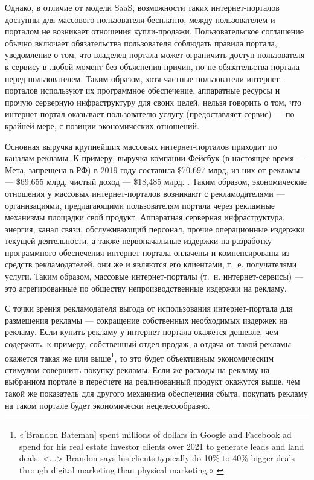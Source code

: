\documentclass{article}
\begin{document}
Однако, в отличие от модели SaaS, возможности таких интернет-порталов доступны для массового пользователя бесплатно, между пользователем и порталом не возникает отношения купли-продажи. Пользовательское соглашение обычно включает обязательства пользователя соблюдать правила портала, уведомление о том, что владелец портала может ограничить доступ пользователя к сервису в любой момент без объяснения причин, но не обязательства портала перед пользователем. Таким образом, хотя частные пользователи интернет-порталов используют их программное обеспечение, аппаратные ресурсы и прочую серверную инфраструктуру для своих целей, нельзя говорить о том, что интернет-портал оказывает пользователю услугу (предоставляет сервис) — по крайней мере, с позиции экономических отношений.

Основная выручка крупнейших массовых интернет-порталов приходит по каналам рекламы. К примеру, выручка компании Фейсбук (в настоящее время — Мета, запрещена в РФ) в 2019 году составила \$70.697 млрд, из них от рекламы — \$69.655 млрд, чистый доход — \$18,485 млрд. \cite{facebook10K2019}. Таким образом, экономические отношения у массовых интернет-порталов возникают с рекламодателями — организациями, предлагающими пользователям портала через рекламные механизмы площадки свой продукт. Аппаратная серверная инфраструктура, энергия, канал связи, обслуживающий персонал, прочие операционные издержки текущей деятельности, а также первоначальные издержки на разработку программного обеспечения интернет-портала оплачены и компенсированы из средств рекламодателей, они же и являются его клиентами, т.~е. получателями услуги. Таким образом, массовые интернет-порталы (т.~н. интернет-сервисы) — это агрегированные по обществу непроизводственные издержки на рекламу.

С точки зрения рекламодателя выгода от использования интернет-портала для размещения рекламы — сокращение собственных необходимых издержек на рекламу. Если купить рекламу у интернет-портала окажется дешевле, чем содержать, к примеру, собственный отдел продаж, а отдача от такой рекламы окажется такая же или выше\footnote{«[Brandon Bateman] spent millions of dollars in Google and Facebook ad spend for his real estate investor clients over 2021 to generate leads and land deals. <...> Brandon says his clients typically do 10\% to 40\% bigger deals through digital marketing than physical marketing.» \cite{roiSEOvsGooglevsFacebook}}, то это будет объективным экономическим стимулом совершить покупку рекламы. Если же расходы на рекламу на выбранном портале в пересчете на реализованный продукт окажутся выше, чем такой же показатель для другого механизма обеспечения сбыта, покупать рекламу на таком портале будет экономически нецелесообразно.
\end{document}
